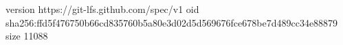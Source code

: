 version https://git-lfs.github.com/spec/v1
oid sha256:ffd5f476750b66cd835760b5a80e3d02d5d569676fce678be7d489cc34e88879
size 11088
